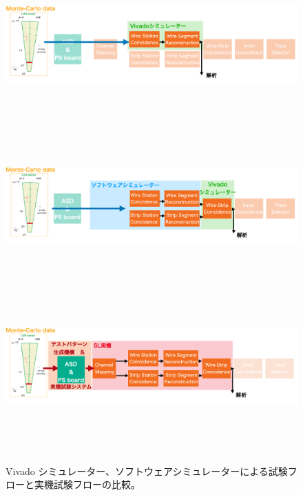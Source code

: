 \begin{figure}
\begin{minipage}[b]{0.9\linewidth}
\centering
\includegraphics[height=4.8cm]{fig/Test/Flow_Wire.png}
\end{minipage}\\
\begin{minipage}[b]{0.9\linewidth}
    \centering
    \includegraphics[height=4.8cm]{fig/Test/Flow_WS.png}
\end{minipage}\\
    \begin{minipage}[b]{0.9\linewidth}
        \centering
        \includegraphics[height=4.8cm]{fig/Test/Flow_zikki.png}
    \end{minipage}\\

\caption[試験フロー]{Vivado シミュレーター、ソフトウェアシミュレーターによる試験フローと実機試験フローの比較。}
\label{Test_Flow}
\end{figure}


